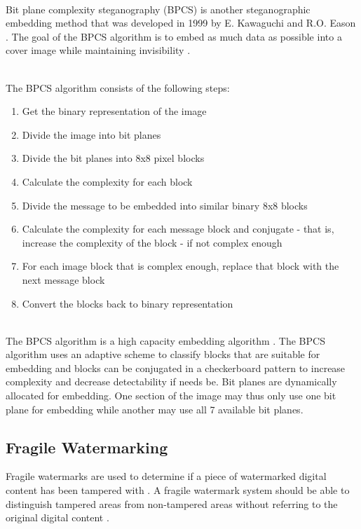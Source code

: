 \documentclass[12pt]{article}
\begin{document}
\hspace{0pt} \\
Bit plane complexity steganography (BPCS) is another steganographic embedding method that was developed in 1999 by E. Kawaguchi and R.O. Eason \cite{kawaguchi1999principles}. 
The goal of the BPCS algorithm is to embed as much data as possible into a cover image while maintaining invisibility \cite{beaullieubpcs}.

\hspace{0pt} \\
The BPCS algorithm consists of the following steps:
\begin{enumerate}
  \item Get the binary representation of the image
  \item Divide the image into bit planes
  \item Divide the bit planes into 8x8 pixel blocks
  \item Calculate the complexity for each block
  \item Divide the message to be embedded into similar binary 8x8 blocks
  \item Calculate the complexity for each message block and conjugate - that is, increase the complexity of the block - if not complex enough
  \item For each image block that is complex enough, replace that block with the next message block
  \item Convert the blocks back to binary representation 
\end{enumerate}

\hspace{0pt} \\
The BPCS algorithm is a high capacity embedding algorithm \cite{beaullieubpcs}.
The BPCS algorithm uses an adaptive scheme to classify blocks that are suitable for embedding and blocks can be conjugated in a checkerboard pattern to increase complexity and decrease detectability if needs be.
Bit planes are dynamically allocated for embedding.
One section of the image may thus only use one bit plane for embedding while another may use all 7 available bit planes.

\subsection{Fragile Watermarking}
\label{introFragWatermarking}
Fragile watermarks are used to determine if a piece of watermarked digital content has been tampered with \cite{liu2007image}. A fragile watermark system should be able to distinguish tampered areas from non-tampered areas without referring to the original digital content \cite{liu2007image}.
\end{document}
